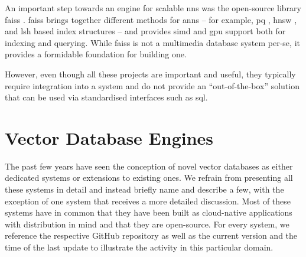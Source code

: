 An important step towards an engine for scalable \acrshort{nns} was the open-source library \acrfull{faiss} \cite{Johnson:2019Billion}. \acrshort{faiss} brings together different methods for \acrshort{anns} -- for example, \acrshort{pq} \cite{Jegou:2010Product}, \acrshort{hnsw} \cite{Malkov:2018Efficient}, and \acrshort{lsh} \cite{Indyk1998:Approximate} based index structures -- and provides  \acrshort{simd} and \acrshort{gpu} support both for indexing and querying. While \acrshort{faiss} is not a multimedia database system per-se, it provides a formidable foundation for building one.

However, even though all these projects are important and useful, they typically require integration into a system and do not provide an ``out-of-the-box'' solution that can be used via standardised interfaces such as \acrshort{sql}.

\section{Vector Database Engines}
\label{section:vector_databases}
The past few years have seen the conception of novel vector databases as either dedicated systems or extensions to existing ones. We refrain from presenting all these systems in detail and instead briefly name and describe a few, with the exception of one system that receives a more detailed discussion. Most of these systems have in common that they have been built as cloud-native applications with distribution in mind and that they are open-source. For every system, we reference the respective GitHub repository as well as the current version and the time of the last update to illustrate the activity in this particular domain.

